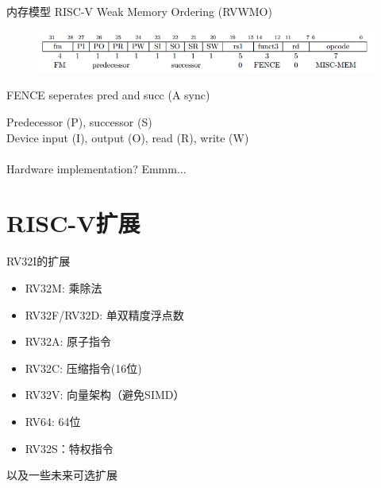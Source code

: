 \documentclass{myslide}
\begin{document}
\begin{frame}{内存模型}
RISC-V Weak Memory Ordering (RVWMO)
\begin{figure}
\centering
\includegraphics[width=\linewidth]{fig/Lecture2/misc-mem.PNG}
\end{figure}
\begin{center}
FENCE seperates pred and succ (A sync)
\end{center}
Predecessor (P), successor (S)\\
Device input (I), output (O), read (R), write (W)\\
\quad\\
Hardware implementation? Emmm...
\end{frame}

\section{RISC-V扩展}
\begin{frame}
\sectionpage
\end{frame}

\begin{frame}{RV32I的扩展}
\begin{itemize}
	\item RV32M: 乘除法
	\item RV32F/RV32D: 单双精度浮点数
	\item RV32A: 原子指令
	\item RV32C: 压缩指令(16位)
	\item RV32V: 向量架构（避免SIMD）
	\item RV64: 64位
	\item RV32S：特权指令
\end{itemize}
以及一些未来可选扩展
\end{frame}
\end{document}
